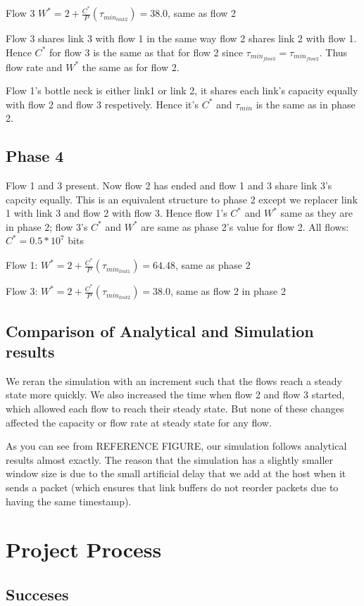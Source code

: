 \documentclass[12pt]{article}
\begin{document}
Flow 3 $W^* = 2+\frac{C^*}{P}(\tau_{min_{link2}}) = 38.0$, same as flow 2

Flow 3 shares link 3 with flow 1 in the same way flow 2 shares link 2 with flow 1. Hence $C^*$ for flow 3 is the same as that for flow 2 since $\tau_{min_{flow3}}=\tau_{min_{flow2}}$. Thus flow rate and $W^*$ the same as for flow 2.

Flow 1's bottle neck is either link1 or link 2, it shares each link's capacity equally with flow 2 and flow 3 respetively. Hence it's $C^*$ and $\tau_{min}$ is the same as in phase 2.


\subsection*{Phase 4}
Flow 1 and 3 present.
Now flow 2 has ended and flow 1 and 3 share link 3's capcity equally. This is an equivalent structure to phase 2 except we replacer link 1 with link 3 and flow 2 with flow 3. Hence flow 1's $C^*$ and $W^*$ same as they are in phase 2; flow 3's $C^*$ and $W^*$ are same as phase 2's value for flow 2.
All flows: $C^* = 0.5*10^7$ bits

Flow 1: $W^* = 2+\frac{C^*}{P}(\tau_{min_{link1}}) = 64.48$, same as phase 2

Flow 3: $W^* = 2+\frac{C^*}{P}(\tau_{min_{link2}}) = 38.0$, same as flow 2 in phase 2


\subsection{Comparison of Analytical and Simulation results}
We reran the simulation with an increment such that the flows reach a steady state more quickly. We also increased the time when flow 2 and flow 3 started, which allowed each flow to reach their steady state. But none of these changes affected the capacity or flow rate at steady state for any flow.

As you can see from REFERENCE FIGURE, our simulation follows analytical results almost exactly. The reason that the simulation has a slightly smaller window size is due to the small artificial delay that we add at the host when it sends a packet (which ensures that link buffers do not reorder packets due to having the same timestamp).

\section{Project Process}
\subsection{Succeses}
\end{document}
